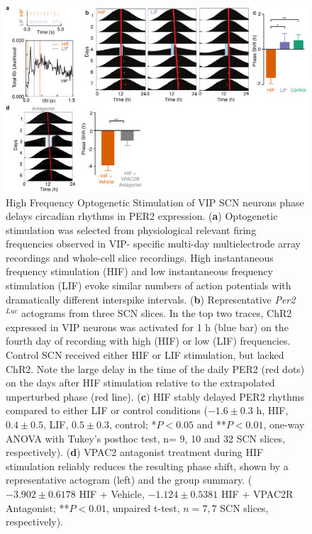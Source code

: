 \begin{figure}[p]
    \begin{center}
        \includegraphics[width=6.5in]{chap5/figures/Figure3.png}
    \end{center}
    \caption{\label{fig:cm3} 
    High Frequency Optogenetic Stimulation of VIP SCN neurons phase delays circadian rhythms in PER2 expression. 
    (\textbf{a}) Optogenetic stimulation was selected from physiological relevant firing frequencies observed in VIP- specific multi-day multielectrode array recordings and whole-cell slice recordings. High instantaneous frequency stimulation (HIF) and low instantaneous frequency stimulation (LIF) evoke similar numbers of action potentials with dramatically different interspike intervals. 
    (\textbf{b}) Representative \textit{Per2}$^{Luc}$ actograms from three SCN slices. In the top two traces, ChR2 expressed in VIP neurons was activated for 1 h (blue bar) on the fourth day of recording with high (HIF) or low (LIF) frequencies. Control SCN received either HIF or LIF stimulation, but lacked ChR2. Note the large delay in the time of the daily PER2 (red dots) on the days after HIF stimulation relative to the extrapolated unperturbed phase (red line). 
    (\textbf{c}) HIF stably delayed PER2 rhythms compared to either LIF or control conditions ($-1.6 \pm 0.3$ h, HIF, $0.4 \pm 0.5$, LIF, $0.5 \pm 0.3$, control; *$P < 0.05$ and **$P < 0.01$, one-way ANOVA with Tukey’s posthoc test, n= 9, 10 and 32 SCN slices, respectively). 
    (\textbf{d}) VPAC2 antagonist treatment during HIF stimulation reliably reduces the resulting phase shift, shown by a representative actogram (left) and the group summary. ($-3.902 \pm 0.6178$ HIF + Vehicle, $-1.124 \pm 0.5381$ HIF + VPAC2R Antagonist; **$P < 0.01$, unpaired t-test, $n =  7,7$ SCN slices, respectively). 
    }
\end{figure}

